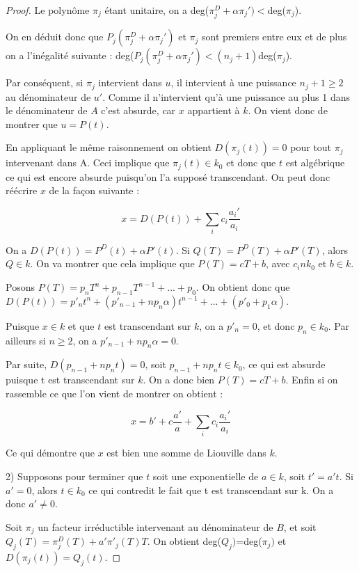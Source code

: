 \documentclass[12pt,a4paper]{report}
\begin{document}
\begin{proof}
Le polynôme $\pi_{j}$ étant unitaire, on a deg($\pi_{j}^{D}+\alpha \pi_{j}')<$deg($\pi_{j}$). 

On en déduit donc que $P_{j}(\pi_{j}^{D}+\alpha \pi_{j}')$ et $\pi_{j}$ sont premiers entre eux et de plus on a l'inégalité suivante : deg($P_{j}(\pi_{j}^{D}+\alpha \pi_{j}')<(n_{j}+1)$deg($\pi_{j}$). 

Par conséquent, si $\pi_{j}$ intervient dans $u$, il intervient à une puissance $n_{j}+1\geq 2$ au dénominateur de $u'$. Comme il n'intervient qu'à une puissance au plus 1 dans le dénominateur de $A$ c'est absurde, car $x$ appartient à $k$. On vient donc de montrer que $u=P(t)$. 

En appliquant le même raisonnement on obtient $D(\pi_{j}(t))=0$ pour tout $\pi_{j}$ intervenant dans A. Ceci implique que $\pi_{j}(t)\in k_{0}$ et donc que $t$ est algébrique ce qui est encore absurde puisqu'on l'a supposé transcendant. On peut donc réécrire $x$ de la façon suivante : 

$$x=D(P(t))+\sum_{i}c_{i}\dfrac{a_{i}'}{a_{i}}$$

On a $D(P(t))=P^{D}(t)+\alpha P'(t).$ Si $Q(T)=P^{D}(T)+\alpha P'(T)$, alors $Q\in k$. On va montrer que cela implique que $P(T)=cT+b$, avec $c_in k_{0}$ et $b\in k$. 

Posons $P(T)=p_{n}T^{n}+p_{n-1}T^{n-1}+...+p_{0}$. On obtient donc que $D(P(t))=p'_{n}t^{n}+(p'_{n-1}+np_{n}\alpha)t^{n-1}+...+(p'_{0}+p_{1}\alpha).$

Puisque $x\in k$ et que $t$ est transcendant sur $k$, on a $p'_{n}=0$, et donc $p_{n} \in k_{0}$. Par ailleurs si $n\geq 2$, on a $p'_{n-1}+np_{n}\alpha=0$. 

Par suite, $D(p_{n-1}+np_{n}t)=0$, soit $p_{n-1}+np_{n}t \in k_{0}$, ce qui est absurde puisque t est transcendant sur $k$. On a donc bien $P(T)=cT+b$. Enfin si on rassemble ce que l'on vient de montrer on obtient : 

$$x=b'+c\dfrac{a'}{a}+\sum_{i}c_{i}\dfrac{a_{i}'}{a_{i}}$$

Ce qui démontre que $x$ est bien une somme de Liouville dans $k$. 

2) Supposons pour terminer que $t$ soit une exponentielle de $a\in k$, soit $t'=a't$. Si $a'=0$, alors $t \in k_{0}$ ce qui contredit le fait que t est transcendant sur k. On a donc $a'\neq 0$. 

Soit $\pi_{j}$ un facteur irréductible intervenant au dénominateur de $B$, et soit $Q_{j}(T)=\pi_{j}^{D}(T)+a'\pi'_{j}(T)T.$ On obtient deg($Q_{j})$=deg($\pi_{j})$ et $D(\pi_{j}(t))=Q_{j}(t).$


\end{proof}
\end{document}
